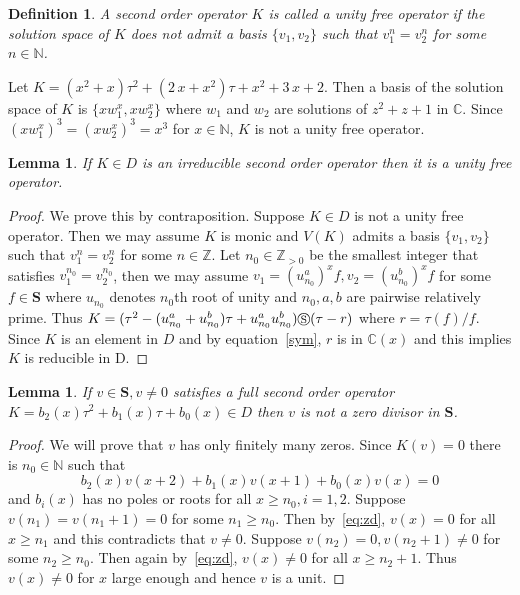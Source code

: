\documentclass{article}
\newtheorem{lemma}[theorem]{Lemma}
\newtheorem{definition}[theorem]{Definition}
\newcommand{\Z}{{\mathbb{Z}}} \newcommand{\Q}{{\mathbb{Q}}}
\newcommand{\C}{{\mathbb{C}}} \newcommand{\N}{{\mathbb{N}}}
\newcommand{\cS}{\circledS}
\newcommand{\Seq}{\mathbf{S}}
\begin{document}
\begin{definition}
  A second order operator $K$ is called a unity free operator if the solution space of
  $K$ does not admit a basis $\{ v_1, v_2 \}$ such that $v_1^n=v_2^n$ for some $n \in \N$.
\end{definition}


Let $K=\left( {x}^{2}+x \right) {\tau}^{2}+ \left( 2\,x+{x}^{2} \right)
\tau+{x}^{2}+3\,x+2$.  Then a basis of the solution space of $K$ is $\{xw_1^x, xw_2^x \}$
where $w_1$ and $w_2$ are solutions of $z^2+z+1$ in $\C$.  Since $ (xw_1^x)^3=
(xw_2^x)^3=x^3$ for $x \in \N$, $K$ is not a unity free operator.



\begin{lemma}
\label{lm:unfr}
If $K \in D$ is an irreducible second order operator then it is a unity free operator.
\end{lemma}

\begin{proof}

  We prove this by contraposition.  Suppose $K \in D$ is not a unity free operator.
  Then we may assume $K$ is monic and $V(K)$ admits a basis $\{ v_1, v_2 \}$ such that
  $v_1^n=v_2^n$ for some $n \in \Z$.  Let $n_0 \in \Z_{>0}$ be the smallest integer that
  satisfies $v_1^{n_0}=v_2^{n_0}$, then we may assume $v_1=(u_{n_0}^a)^xf,
  v_2=(u_{n_0}^b)^xf$ for some $f \in \Seq$ where $u_{n_0}$ denotes $n_0$th root of unity
  and $n_0, a, b$ are pairwise relatively prime.  Thus
  $K=(\tau^2-(u_{n_0}^a+u_{n_0}^b)\tau+u_{n_0}^au_{n_0}^b) \cS (\tau-r)$ where
  $r=\tau(f)/f$. Since $K$ is an element in $D$ and by equation~\eqref{sym}, $r$ is in
  $\C(x)$ and this implies $K$ is reducible in D.
\end{proof}

\begin{lemma}
\label{lm:zd}
If $v \in \Seq, v \neq 0$ satisfies a full second order operator $K=b_2(x)\tau^2+b_1(x)\tau+b_0(x) \in D$ then 
$v$ is not a zero divisor in $\Seq$.
\end{lemma}

\begin{proof}
We will prove that $v$ has only finitely many zeros.
Since $K(v)=0$ there is $n_0 \in \N$ such that 
\begin{equation}\label{eq:zd}
b_2(x)v(x+2)+b_1(x)v(x+1)+b_0(x)v(x)=0
\end{equation}
and $b_i(x)$ has no poles or roots for all $x \geq n_0,i=1,2$. Suppose $v(n_1)=v(n_1+1)=0$
for some $n_1 \geq n_0$. Then by~\eqref{eq:zd}, $v(x)=0$ for all $x \geq n_1$ and this
contradicts that $v \neq 0$. Suppose $v(n_2)=0, v(n_2+1) \neq 0$ for some $n_2 \geq n_0$.
Then again by~\eqref{eq:zd}, $v(x) \neq 0$ for all $x \geq n_2+1$. Thus $v(x) \neq 0$ for
$x$ large enough and hence $v$ is a unit.
\end{proof}
\end{document}
